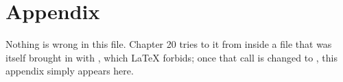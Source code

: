 \section{Appendix}

Nothing is wrong in this file. Chapter 20 tries to \verb|| it from inside a file
that was itself brought in with \verb||, which LaTeX forbids; once that call is
changed to \verb||, this appendix simply appears here.
